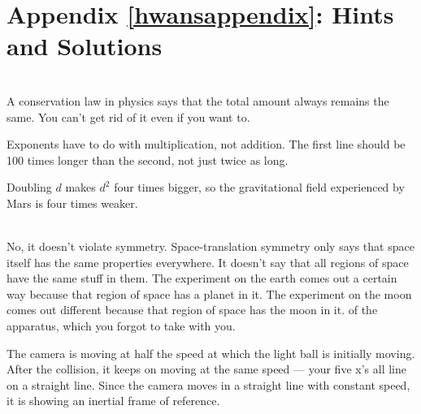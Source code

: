 \label{hwansappendix}%
\appendix\chapter{Appendix \ref{hwansappendix}: Hints and Solutions}
	




\noindent{}


\noindent{}\\
 A conservation law in physics says that the total
amount always remains the same. You can't get rid of it even if you want to.

Exponents have to do with multiplication, not addition. The
first line should be 100 times longer than the second,
not just twice as long.

Doubling $d$ makes $d^2$ four times bigger, so the gravitational field experienced
by Mars is four times weaker.


\noindent{}\\
 No, it doesn't violate symmetry. Space-translation symmetry
only says that space itself has the same properties everywhere. It doesn't say that all regions
of space have the same stuff in them. The experiment on the earth comes out a certain way because
that region of space has a planet in it. The experiment on the moon comes out different because
that region of space has the moon in it. of the apparatus, which you forgot to take with you.

 The camera is moving at half the speed at which the light ball is initially
moving. After the collision, it keeps on moving at the same speed --- your five x's all line
on a straight line. Since the camera moves in a straight line with constant speed, it is
showing an inertial frame of reference.

